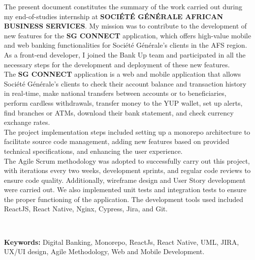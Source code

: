 The present document constitutes the summary of the work carried out during my end-of-studies internship at \textbf{SOCIÉTÉ GÉNÉRALE AFRICAN BUSINESS SERVICES}. My mission was to contribute to the development of new features for the \textbf{SG CONNECT} application, which offers high-value mobile and web banking functionalities for Société Générale's clients in the AFS region.\\

As a front-end developer, I joined the Bank Up team and participated in all the necessary steps for the development and deployment of these new features.\\

The \textbf{SG CONNECT} application is a web and mobile application that allows Société Générale's clients to check their account balance and transaction history in real-time, make national transfers between accounts or to beneficiaries, perform cardless withdrawals, transfer money to the YUP wallet, set up alerts, find branches or ATMs, download their bank statement, and check currency exchange rates.\\

The project implementation steps included setting up a monorepo architecture to facilitate source code management, adding new features based on provided technical specifications, and enhancing the user experience.\\

The Agile Scrum methodology was adopted to successfully carry out this project, with iterations every two weeks, development sprints, and regular code reviews to ensure code quality. Additionally, wireframe design and User Story development were carried out. We also implemented unit tests and integration tests to ensure the proper functioning of the application. The development tools used included ReactJS, React Native, Nginx, Cypress, Jira, and Git.

\vfill

\begin{center}
	\HRule \
\end{center}

\textbf{Keywords:} Digital Banking, Monorepo, ReactJs, React Native, UML, JIRA, UX/UI design, Agile Methodology, Web and Mobile Development.\\
\begin{center}
	\HRule
\end{center}